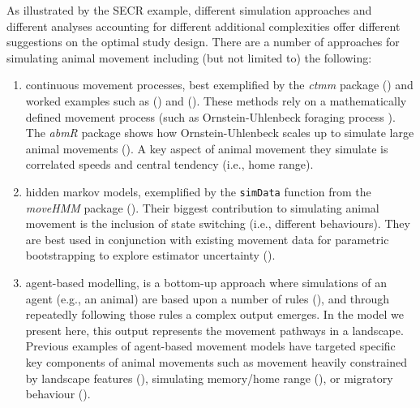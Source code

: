 \documentclass[10pt,a4paper]{article}
\begin{document}
As illustrated by the SECR example, different simulation approaches and different analyses accounting for different additional complexities offer different suggestions on the optimal study design.
There are a number of approaches for simulating animal movement including (but not limited to) the following:

\begin{enumerate}
\def\labelenumi{\arabic{enumi}.}
\item
  continuous movement processes, best exemplified by the \emph{ctmm} package () and worked examples such as () and ().
  These methods rely on a mathematically defined movement process (such as Ornstein-Uhlenbeck foraging process ).
  The \emph{abmR} package shows how Ornstein-Uhlenbeck scales up to simulate large animal movements ().
  A key aspect of animal movement they simulate is correlated speeds and central tendency (i.e., home range).
\item
  hidden markov models, exemplified by the \texttt{simData} function from the \emph{moveHMM} package ().
  Their biggest contribution to simulating animal movement is the inclusion of state switching (i.e., different behaviours).
  They are best used in conjunction with existing movement data for parametric bootstrapping to explore estimator uncertainty ().
\item
  agent-based modelling, is a bottom-up approach where simulations of an agent (e.g., an animal) are based upon a number of rules (), and through repeatedly following those rules a complex output emerges.
  In the model we present here, this output represents the movement pathways in a landscape.
  Previous examples of agent-based movement models have targeted specific key components of animal movements such as movement heavily constrained by landscape features (), simulating memory/home range (), or migratory behaviour ().
\end{enumerate}
\end{document}
